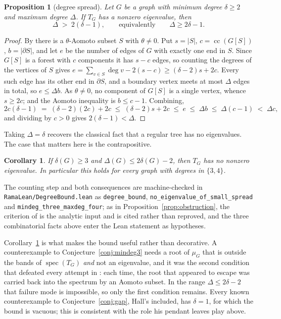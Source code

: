 \documentclass[11pt]{article}
\newtheorem{corollary}[theorem]{Corollary}
\newtheorem{proposition}[theorem]{Proposition}
\theoremstyle{remark}
\begin{document}
\begin{proposition}[degree spread]\label{prop:degbound}
Let $G$ be a graph with minimum degree $\delta\ge2$ and maximum degree $\Delta$. If $T_G$ has a
nonzero eigenvalue, then
\[
  \Delta \;>\; 2(\delta-1),\qquad\text{equivalently}\qquad \Delta\ge 2\delta-1 .
\]
\end{proposition}

\begin{proof}
By \cite{BGM} there is a $\theta$-Aomoto subset $S$ with $\theta\ne0$. Put $s=|S|$,
$c=\operatorname{cc}(G[S])$, $b=|\partial S|$, and let $e$ be the number of edges of $G$ with
exactly one end in $S$. Since $G[S]$ is a forest with $c$ components it has $s-c$ edges, so
counting the degrees of the vertices of $S$ gives $e=\sum_{v\in S}\deg v-2(s-c)\ge(\delta-2)s+2c$.
Every such edge has its other end in $\partial S$, and a boundary vertex meets at most $\Delta$
edges in total, so $e\le\Delta b$. As $\theta\ne0$, no component of $G[S]$ is a single vertex,
whence $s\ge2c$; and the Aomoto inequality is $b\le c-1$. Combining,
\[
  2c(\delta-1)\;=\;(\delta-2)(2c)+2c\;\le\;(\delta-2)s+2c\;\le\;e\;\le\;\Delta b\;\le\;\Delta(c-1)
  \;<\;\Delta c ,
\]
and dividing by $c>0$ gives $2(\delta-1)<\Delta$.
\end{proof}

Taking $\Delta=\delta$ recovers the classical fact that a regular tree has no eigenvalues. The case
that matters here is the contrapositive.

\begin{corollary}\label{cor:trapfree}
If $\delta(G)\ge3$ and $\Delta(G)\le 2\delta(G)-2$, then $T_G$ has no nonzero eigenvalue. In
particular this holds for every graph with degrees in $\{3,4\}$.
\end{corollary}

The counting step and both consequences are machine-checked in
\texttt{RamaLean/DegreeBound.lean} as \texttt{degree\_bound},
\texttt{no\_eigenvalue\_of\_small\_spread} and \texttt{mindeg\_three\_maxdeg\_four}; as in
Proposition~\ref{prop:obstruction}, the criterion of \cite{BGM} is the analytic input and is cited
rather than reproved, and the three combinatorial facts above enter the Lean statement as
hypotheses.

Corollary~\ref{cor:trapfree} is what makes the bound useful rather than decorative. A counterexample
to Conjecture~\ref{conj:mindeg3} needs a root of $\mu_G$ that is outside the bands of
$\operatorname{spec}(T_G)$ \emph{and} not an eigenvalue, and it was the second condition that
defeated every attempt in \cite{Supp}: each time, the root that appeared to escape was carried back
into the spectrum by an Aomoto subset. In the range $\Delta\le2\delta-2$ that failure mode is
impossible, so only the first condition remains. Every known counterexample to
Conjecture~\ref{conj:gap}, Hall's included, has $\delta=1$, for which the bound is vacuous; this is
consistent with the role his pendant leaves play above.
\end{document}
